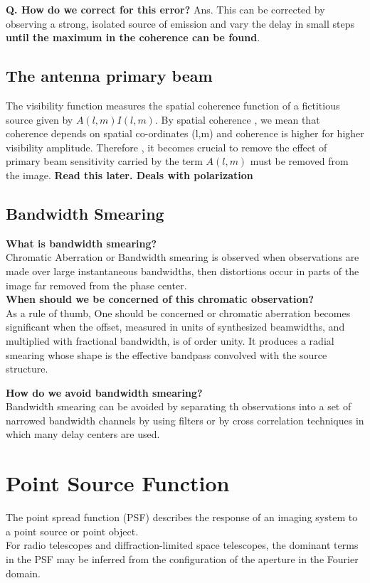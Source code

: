 \documentclass[10pt]{report}
\newcommand{\tbf}[1]{\textbf{#1}}
\begin{document}
\tbf{Q. How do we correct for this error?}
Ans. This can be corrected by observing a strong, isolated source of emission and vary the delay in small steps \tbf{until the maximum in the coherence can be found}.
\subsection{The antenna primary beam}
The visibility function measures the spatial coherence function of a fictitious source given by $A(l,m)I(l,m)$. By spatial coherence , we mean that coherence depends on spatial co-ordinates (l,m) and coherence is higher for higher visibility amplitude. Therefore , it becomes crucial to remove the effect of primary beam sensitivity carried by the term $A(l,m)$ must be removed from the image. \tbf{Read this later. Deals with polarization}
\subsection{Bandwidth Smearing}
\tbf{What is bandwidth smearing?}\\
Chromatic Aberration or Bandwidth smearing is observed when observations are made over large instantaneous bandwidths, then distortions occur in parts of the image far removed from the phase center. \\

\tbf{When should we be concerned of this chromatic observation?}\\
As a rule of thumb, One should be concerned or chromatic aberration becomes significant when the offset, measured in units of synthesized beamwidths, and multiplied with fractional bandwidth, is of order unity. It produces a radial smearing whose shape is the effective bandpass convolved with the source structure.  


\tbf{How do we avoid bandwidth smearing?}\\
Bandwidth smearing can be avoided by separating th observations into a set of narrowed bandwidth channels by using filters or by cross correlation techniques in which many delay centers are used.

\section{Point Source Function}
The point spread function (PSF) describes the response of an imaging system to a point source or point object. \\

For radio telescopes and diffraction-limited space telescopes, the dominant terms in the PSF may be inferred from the configuration of the aperture in the Fourier domain.\\
\end{document}
